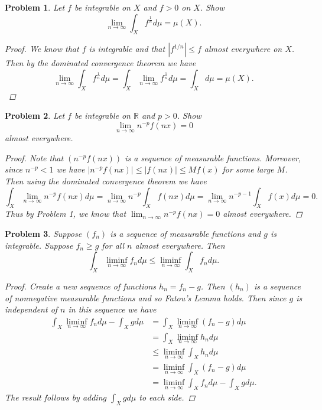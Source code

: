 \documentclass{article}
\newtheorem{problem}{Problem}
\newcommand{\dmu}{d\mu}
\begin{document}
\begin{problem}
Let $f$ be integrable on $X$ and $f > 0$ on $X$. Show
\[
\lim_{n \rightarrow \infty} \int_X f^{\frac{1}{n}} \dmu = \mu(X).
\]
\begin{proof}
We know that $f$ is integrable and that $|f^{1/n}| \leq f$ almost everywhere on $X$. Then by the dominated convergence theorem we have
\[
\lim_{n \rightarrow \infty} \int_X f^{\frac{1}{n}} \dmu = \int_X \lim_{n \rightarrow \infty} f^{\frac{1}{n}} \dmu = \int_X \dmu = \mu(X).
\]
\end{proof}
\end{problem}

\begin{problem}
Let $f$ be integrable on $\mathbb{R}$ and $p > 0$. Show
\[
\lim_{n \rightarrow \infty} n^{-p} f(nx) = 0
\]
almost everywhere.
\begin{proof}
Note that $(n^{-p} f(nx))$ is a sequence of measurable functions. Moreover, since $n^{-p} < 1$ we have $|n^{-p} f(nx)| \leq |f(nx)| \leq Mf(x)$ for some large $M$. Then using the dominated convergence theorem we have
\[
\int_X \lim_{n \rightarrow \infty} n^{-p} f(nx) \dmu = \lim_{n \rightarrow \infty} n^{-p} \int_X f(nx) \dmu = \lim_{n \rightarrow \infty} n^{-p-1} \int_X f(x) \dmu = 0.
\]
Thus by Problem 1, we know that $\lim_{n \rightarrow \infty} n^{-p} f(nx) = 0$ almost everywhere.
\end{proof}
\end{problem}

\begin{problem}
Suppose $(f_n)$ is a sequence of measurable functions and $g$ is integrable. Suppose $f_n \geq g$ for all $n$ almost everywhere. Then
\[
\int_X \liminf_{n \rightarrow \infty} f_n \dmu \leq \liminf_{n \rightarrow \infty} \int_X f_n \dmu.
\]
\begin{proof}
Create a new sequence of functions $h_n = f_n - g$. Then $(h_n)$ is a sequence of nonnegative measurable functions and so Fatou's Lemma holds. Then since $g$ is independent of $n$ in this sequence we have
\begin{align*}
\int_X \liminf_{n \rightarrow \infty} f_n \dmu - \int_X g \dmu
&= \int_X \liminf_{n \rightarrow \infty} (f_n - g) \dmu\\
&= \int_X \liminf_{n \rightarrow \infty} h_n \dmu\\
&\leq \liminf_{n \rightarrow \infty} \int_X h_n \dmu\\
&= \liminf_{n \rightarrow \infty} \int_X (f_n - g) \dmu\\
&= \liminf_{n \rightarrow \infty} \int_X f_n \dmu - \int_X g \dmu.
\end{align*}
The result follows by adding $\int_X g \dmu$ to each side.
\end{proof}
\end{problem}
\end{document}
